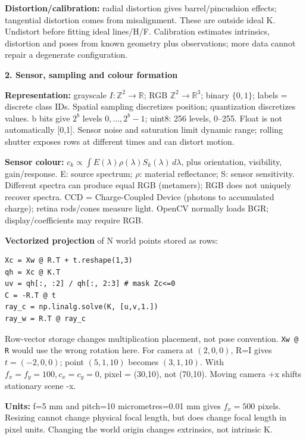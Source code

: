 \documentclass[a4paper]{article}
\newcommand{\key}[1]{\textbf{#1}}
\newcommand{\Topic}[1]{\par\vspace{1.7pt}\noindent
  {\fontsize{7.7}{8.0}\selectfont\bfseries #1}\par\vspace{0.3pt}}
\newcommand{\R}{\mathbb R}
\newcounter{sheet}
\newcounter{sheetcolumn}
\newlength{\colwidth}
\newenvironment{sheetcol}[1][7.0]{\stepcounter{sheetcolumn}
  \begin{lrbox}{\columnbox}\begin{minipage}[t]{\colwidth}\vspace{0pt}
  \fontsize{#1}{\dimexpr#1pt+0.6pt\relax}\selectfont}
  {\end{minipage}\end{lrbox}
  \typeout{CV1COL|\thesheet|\thesheetcolumn|\the\dimexpr\ht\columnbox+\dp\columnbox\relax}
  \usebox{\columnbox}\ignorespacesafterend}
\newcommand{\Sep}{\hfill}
\begin{document}
\begin{sheetcol}[6.85]
\key{Distortion/calibration:} radial distortion gives barrel/pincushion effects; tangential distortion comes from misalignment. These are outside ideal K. Undistort before fitting ideal lines/H/F. Calibration estimates intrinsics, distortion and poses from known geometry plus observations; more data cannot repair a degenerate configuration.

\Topic{2. Sensor, sampling and colour formation}
\key{Representation:} grayscale \(I:\mathbb Z^2\to\R\); RGB \(\mathbb Z^2\to\R^3\); binary \(\{0,1\}\); labels = discrete class IDs. Spatial sampling discretizes position; quantization discretizes values. b bits give \(2^b\) levels \(0,\ldots,2^b-1\); uint8: 256 levels, 0--255. Float is not automatically [0,1]. Sensor noise and saturation limit dynamic range; rolling shutter exposes rows at different times and can distort motion.

\key{Sensor colour:} \(c_k\propto\int E(\lambda)\rho(\lambda)S_k(\lambda)\,d\lambda\), plus orientation, visibility, gain/response. E: source spectrum; \(\rho\): material reflectance; S: sensor sensitivity. Different spectra can produce equal RGB (metamers); RGB does not uniquely recover spectra. CCD = Charge-Coupled Device (photons to accumulated charge); retina rods/cones measure light. OpenCV normally loads BGR; display/coefficients may require RGB.

\key{Vectorized projection} of N world points stored as rows:
\begin{lstlisting}
Xc = Xw @ R.T + t.reshape(1,3)
qh = Xc @ K.T
uv = qh[:, :2] / qh[:, 2:3] # mask Zc<=0
C = -R.T @ t
ray_c = np.linalg.solve(K, [u,v,1.])
ray_w = R.T @ ray_c
\end{lstlisting}
Row-vector storage changes multiplication placement, not pose convention. \texttt{Xw @ R} would use the wrong rotation here. For camera at \((2,0,0)\), R=I gives \(t=(-2,0,0)\); point \((5,1,10)\) becomes \((3,1,10)\). With \(f_x=f_y=100,c_x=c_y=0\), pixel = (30,10), not (70,10). Moving camera +x shifts stationary scene -x.

\key{Units:} f=5 mm and pitch=10 micrometres=0.01 mm gives \(f_x=500\) pixels. Resizing cannot change physical focal length, but does change focal length in pixel units. Changing the world origin changes extrinsics, not intrinsic K.
\end{sheetcol}\Sep
\end{document}
